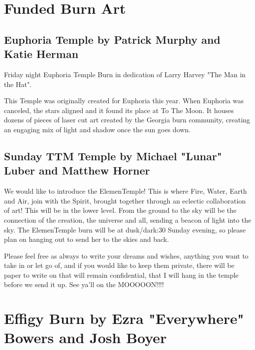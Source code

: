 \begin{multicols}{2}
\section*{Funded Burn Art}

\subsection*{Euphoria Temple by Patrick Murphy and Katie Herman}

Friday night Euphoria Temple Burn in dedication of Larry Harvey "The Man in the Hat".

This Temple was originally created for Euphoria this year.  When Euphoria was canceled, the stars aligned and it found its place at To The Moon.  It houses dozens of pieces of laser cut art created by the Georgia burn community, creating an engaging mix of light and shadow once the sun goes down.  

\subsection*{Sunday TTM Temple by  Michael "Lunar" Luber and Matthew Horner}
We would like to introduce the ElemenTemple! This is where Fire, Water, Earth and Air, join with the Spirit, brought together through an eclectic collaboration of art! This will be in the lower level. 
From the ground to the sky will be the connection of the creation, the universe and all, sending a beacon of light into the sky.
The ElemenTemple burn will be at dusk/dark:30 Sunday evening, so please plan on hanging out to send her to the skies and back.

Please feel free as always to write your dreams and wishes, anything you want to take in or let go of, and if you would like to keep them private, there will be paper to write on that will remain confidential, that I will hang in the temple before we send it up.
See ya'll on the MOOOOON!!!!

\section*{Effigy Burn by Ezra "Everywhere" Bowers and Josh Boyer}

 

\end{multicols}